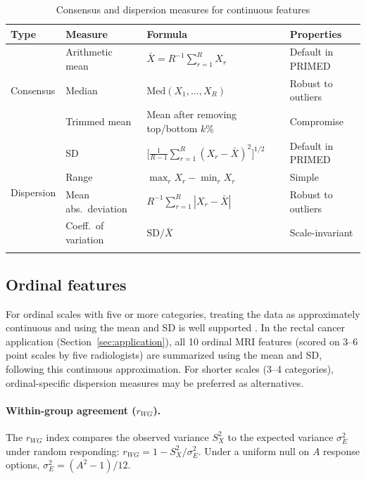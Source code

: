 \documentclass[referee,lineno,pdflatex,sn-vancouver-num]{sn-jnl}
\begin{document}
\begin{appendices}
\begin{table}[h]
\caption{Consensus and dispersion measures for continuous features}\label{tab:continuous_measures}
\small
\renewcommand{\arraystretch}{1.3}
\begin{tabular*}{\textwidth}{@{\extracolsep\fill}l l p{} l}
\toprule
Type & Measure & Formula & Properties \\
\midrule
\multirow{3}{*}{Consensus}
& Arithmetic mean & $\bar X = R^{-1}\sum_{r=1}^R X_r$ & Default in PRIMED \\
& Median & $\mathrm{Med}(X_1,\dots,X_R)$ & Robust to outliers \\
& Trimmed mean & Mean after removing top/bottom $k$\% & Compromise \\
\midrule
\multirow{4}{*}{Dispersion}
& SD & $\bigl[\frac{1}{R-1}\sum_{r=1}^R(X_r-\bar X)^2\bigr]^{1/2}$ & Default in PRIMED \\
& Range & $\max_r X_r - \min_r X_r$ & Simple \\
& Mean abs.\ deviation & $R^{-1}\sum_{r=1}^R |X_r - \bar X|$ & Robust to outliers \\
& Coeff.\ of variation & $\mathrm{SD}/\bar X$ & Scale-invariant \\
\botrule
\end{tabular*}
\end{table}

\subsection{Ordinal features}\label{secA3}

For ordinal scales with five or more categories, treating the data as approximately continuous and using the mean and SD is well supported \cite{Norman2010,Sullivan2013}.
In the rectal cancer application (Section~\ref{sec:application}), all 10 ordinal MRI features (scored on 3--6 point scales by five radiologists) are summarized using the mean and SD, following this continuous approximation.
For shorter scales (3--4 categories), ordinal-specific dispersion measures may be preferred as alternatives.

\paragraph{Within-group agreement ($r_{WG}$).}
The $r_{WG}$ index \cite{James1984} compares the observed variance $S_X^2$ to the expected variance $\sigma_E^2$ under random responding:
$r_{WG} = 1 - S_X^2 / \sigma_E^2$.
Under a uniform null on $A$ response options, $\sigma_E^2 = (A^2-1)/12$.


\end{appendices}
\end{document}
